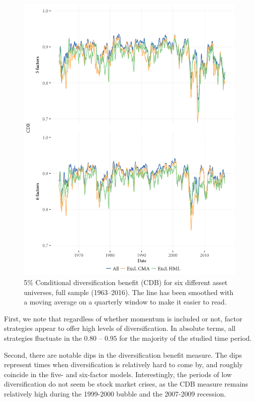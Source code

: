 \begin{figure}
  \centering
  \footnotesize
  \renewcommand{\arraystretch}{1.2}
  \caption{5\% Conditional diversification benefit (CDB) for six different asset universes, full sample (1963--2016). 
  The line has been smoothed with a moving average on a quarterly window to make it easier to read.}
  \label{fig:cdb}
  \includegraphics[scale = 1]{graphics/cdb_5F_6F.png}
\end{figure}

First, we note that regardless of whether momentum is included or not, factor strategies appear to offer high levels of diversification. In absolute terms, all strategies fluctuate in the $0.80$ -- $0.95$ for the majority of the studied time period. 

Second, there are notable dips in the diversification benefit measure. The dips represent times when diversification is relatively hard to come by, and roughly coincide in the five- and six-factor models. Interestingly, the periods of low diversification do not seem be stock market crises, as the CDB measure remains relatively high during the 1999-2000 bubble and the 2007-2009 recession.

